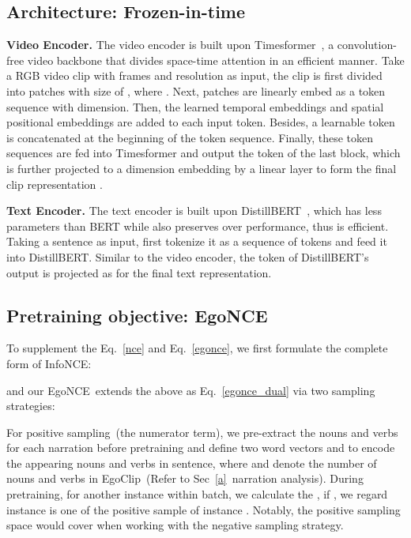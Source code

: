 \documentclass{article}
\newcommand{\dataset}{EgoClip}
\newcommand{\model}{EgoNCE\xspace}
\begin{document}
\subsection{Architecture: Frozen-in-time~\cite{bain2021frozen}}
\textbf{Video Encoder.}
The video encoder is built upon Timesformer~\cite{timesformer}, a convolution-free video backbone that divides space-time attention in an efficient manner.
Take a RGB video clip  with  frames and resolution  as input, the clip is first divided into  patches  with size of , where . 
Next, patches  are linearly embed as a token sequence  with  dimension. 
Then, the learned temporal embeddings  and spatial positional embeddings   are added to each input token. Besides, a learnable  token is concatenated at the beginning of the token sequence. 
Finally, these token sequences are fed into Timesformer and output the  token of the last block, which is further projected to a  dimension embedding by a linear layer to form the final clip representation .

\textbf{Text Encoder.}
The text encoder is built upon DistillBERT~\cite{distilbert}, which has  less parameters than BERT while also preserves over  performance, thus is efficient.
Taking a sentence  as input, first tokenize it as a sequence of tokens and feed it into DistillBERT. 
Similar to the video encoder, the  token of DistillBERT's output is projected as  for the final text representation.

\subsection{Pretraining objective: \model}
To supplement the Eq.~\ref{nce} and Eq.~\ref{egonce}, we first formulate the complete form of InfoNCE:


and our \model~extends the above as Eq.~\ref{egonce_dual} via two sampling strategies:



For positive sampling~(the numerator term), we pre-extract the nouns and verbs for each narration  before pretraining and define two word vectors  and   to encode the appearing nouns and verbs in sentence, where  and  denote the number of nouns and verbs in \dataset~(Refer to Sec~\ref{a}~narration analysis). 
During pretraining, for another instance  within batch, we calculate the , if , we regard instance  is one of the positive sample  of instance .
Notably, the positive sampling space  would cover  when working with the negative sampling strategy.
\end{document}
